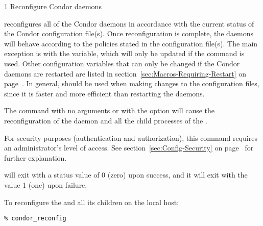 \begin{ManPage}{\label{man-condor-reconfig}}{1}
{Reconfigure Condor daemons}
\Synopsis {}
\ToolArgsBase

\ToolDebugOption
\ToolArgsLocate
\ToolArgsAffect

\ToolDebugOption
\ToolWhere
\ToolArgsAffect


\Description 

 reconfigures all of the Condor daemons in accordance with 
the current
status of the Condor configuration file(s).  
Once reconfiguration is complete, the daemons will behave according to
the policies stated in the configuration file(s).
The main exception is with the  variable,
which will only be
updated if the  command is used.  
Other configuration variables that can only be changed
if the Condor daemons are restarted are listed in
section~\ref{sec:Macros-Requiring-Restart}
on page~\pageref{sec:Macros-Requiring-Restart}.
In general,  should be used when making changes to
the configuration files, since it is faster and more efficient than
restarting the daemons.

The command 
with no arguments or with the  option 
will cause the reconfiguration of the 
daemon and all the child processes of the .

For security purposes (authentication and authorization),
this command requires an administrator's level of access.
See
section~\ref{sec:Config-Security} on page~\pageref{sec:Config-Security}
for further explanation.

\begin{Options}
    \ToolArgsBaseDesc
    \ToolDebugDesc
    \ToolArgsLocateDesc
    \ToolArgsAffectDesc
\end{Options}

\ExitStatus

 will exit with a status value of 0 (zero) upon success,
and it will exit with the value 1 (one) upon failure.

\Examples
To reconfigure the  and all its children
on the local host:
\begin{verbatim}
% condor_reconfig
\end{verbatim}


\end{ManPage}
